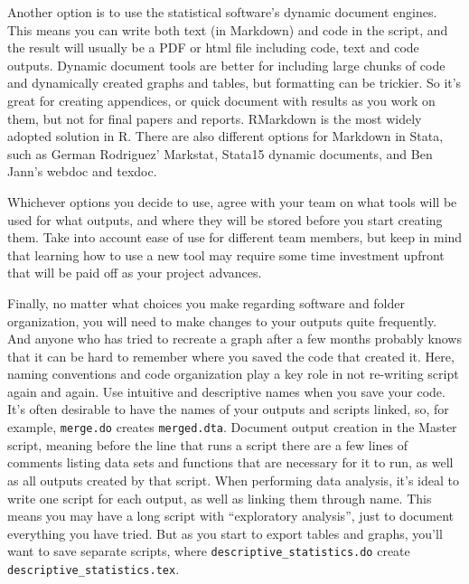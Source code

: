 Another option is to use the statistical software's dynamic document engines. 
This means you can write both text (in Markdown) and code in the script, 
and the result will usually be a PDF or html file including code, 
text and code outputs.  
Dynamic document tools are better for including large chunks of code and dynamically created graphs and tables, 
but formatting can be trickier. 
So it's great for creating appendices, 
or quick document with results as you work on them, 
but not for final papers and reports. 
RMarkdown is the most widely adopted solution in R.
There are also different options for Markdown in Stata,
such as German Rodriguez' Markstat,
Stata15 dynamic documents,
and Ben Jann's webdoc and 
texdoc. 

Whichever options you decide to use, 
agree with your team on what tools will be used for what outputs, and
where they will be stored before you start creating them. 
Take into account ease of use for different team members, but
keep in mind that learning how to use a new tool may require some 
time investment upfront that will be paid off as your project advances.

Finally, no matter what choices you make regarding software and folder organization, 
you will need to make changes to your outputs quite frequently. 
And anyone who has tried to recreate a graph after a few months probably knows 
that it can be hard to remember where you saved the code that created it. 
Here, naming conventions and code organization play a key role in not re-writing script again and again.
Use intuitive and descriptive names when you save your code. 
It's often desirable to have the names of your outputs and scripts linked, 
so, for example, \texttt{merge.do} creates \texttt{merged.dta}.
Document output creation in the Master script, 
meaning before the line that runs a script there are a few lines of comments listing 
data sets and functions that are necessary for it to run, 
as well as all outputs created by that script. 
When performing data analysis, 
it's ideal to write one script for each output, 
as well as linking them through name. 
This means you may have a long script with ``exploratory analysis'', 
just to document everything you have tried. 
But as you start to export tables and graphs, 
you'll want to save separate scripts, where 
\texttt{descriptive\_statistics.do} create \texttt{descriptive\_statistics.tex}. 

